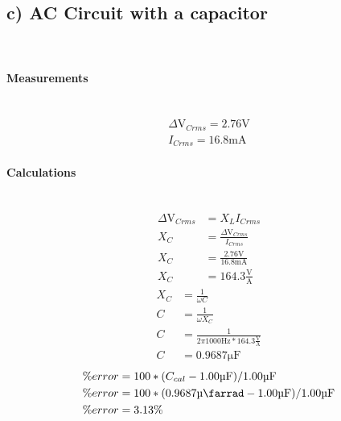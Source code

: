 \documentclass{report}
\begin{document}
\subsection*{c) AC Circuit with a capacitor}\mbox{}\\
\paragraph{Measurements}\mbox{}\\
\begin{gather}
    \Delta\si{\volt}_{Crms}=2.76\si{\volt}\\
    I_{Crms}=16.8\si{\milli\ampere}
\end{gather}
\paragraph{Calculations}\mbox{}\\
\begin{align}
    \Delta\si{\volt}_{Crms}&=X_{L}I_{Crms}\nonumber\\
    X_{C}&=\frac{\Delta\si{\volt}_{Crms}}{I_{Crms}}\nonumber\\
    X_{C}&=\frac{2.76\si{\volt}}{16.8\si{\milli\ampere}}\nonumber\\
    X_{C}&=164.3\frac{\si{\volt}}{\si{\ampere}}\label{eq:xccalc}
\end{align}
\begin{align}
    X_{C}&=\frac{1}{\omega C}\nonumber\\
    C&=\frac{1}{\omega X_{C}}\nonumber\\
    C&=\frac{1}{2\pi1000\si{\hertz}*164.3\frac{\si{\volt}}{\si{\ampere}}}\nonumber\\
    C&=0.9687\si{\micro\farad}
\end{align}
\begin{align}
    \%error&=100 * (C_{cal} - 1.00\si{\micro\farad})/1.00\si{\micro\farad}\nonumber\\
    \%error&=100 * (0.9687\si{\micro\farrad} - 1.00\si{\micro\farad})/1.00\si{\micro\farad}\nonumber\\
    \%error&=3.13\%
\end{align}
\end{document}
